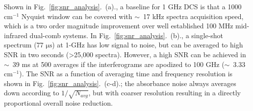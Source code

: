 \documentclass{optica-article}
\begin{document}
Shown in Fig.~\ref{fig:snr_analysis}.~(a)., a baseline for 1 GHz DCS is that a 1000 $\mathrm{cm^{-1}}$ Nyquist window can be covered with $\sim$~17 kHz spectra acquisition speed, which is a two order magnitude improvement over well established 100 MHz mid-infrared dual-comb systems. In Fig.~\ref{fig:snr_analysis}.~(b)., a single-shot spectrum (77 $\mathrm{\mu s}$) at 1-GHz has low signal to noise, but can be averaged to high SNR in two seconds (>25,000 spectra). However, a high SNR can be achieved in $\sim$~39 ms at 500 averages if the interferograms are apodized to 100 GHz ($\sim$~3.33 $\mathrm{cm^{-1}}$).  The SNR as a function of averaging time and frequency resolution is shown in Fig.~\ref{fig:snr_analysis}.~(c-d).; the absorbance noise always averages down according to $1/\sqrt{N_{avg}}$, but with coarser resolution resulting in a directly proportional overall noise reduction. 



\end{document}

